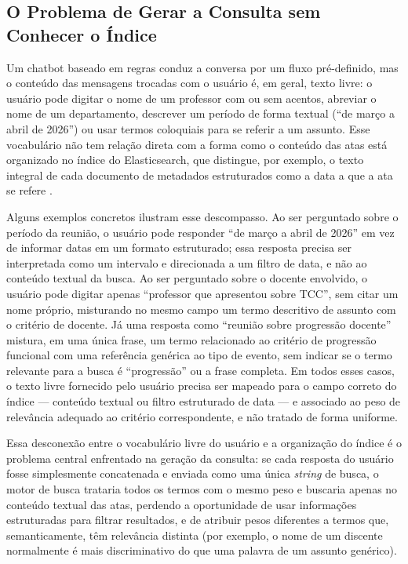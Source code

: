 \subsection{O Problema de Gerar a Consulta sem Conhecer o Índice}\label{sec:problema-gerar-consulta}

Um chatbot baseado em regras conduz a conversa por um fluxo pré-definido, mas o conteúdo das mensagens trocadas com o usuário é, em geral, texto livre: o usuário pode digitar o nome de um professor com ou sem acentos, abreviar o nome de um departamento, descrever um período de forma textual (``de março a abril de 2026'') ou usar termos coloquiais para se referir a um assunto. Esse vocabulário não tem relação direta com a forma como o conteúdo das atas está organizado no índice do Elasticsearch, que distingue, por exemplo, o texto integral de cada documento de metadados estruturados como a data a que a ata se refere \cite{IBMElasticsearch}.

Alguns exemplos concretos ilustram esse descompasso. Ao ser perguntado sobre o período da reunião, o usuário pode responder ``de março a abril de 2026'' em vez de informar datas em um formato estruturado; essa resposta precisa ser interpretada como um intervalo e direcionada a um filtro de data, e não ao conteúdo textual da busca. Ao ser perguntado sobre o docente envolvido, o usuário pode digitar apenas ``professor que apresentou sobre TCC'', sem citar um nome próprio, misturando no mesmo campo um termo descritivo de assunto com o critério de docente. Já uma resposta como ``reunião sobre progressão docente'' mistura, em uma única frase, um termo relacionado ao critério de progressão funcional com uma referência genérica ao tipo de evento, sem indicar se o termo relevante para a busca é ``progressão'' ou a frase completa. Em todos esses casos, o texto livre fornecido pelo usuário precisa ser mapeado para o campo correto do índice — conteúdo textual ou filtro estruturado de data — e associado ao peso de relevância adequado ao critério correspondente, e não tratado de forma uniforme.

Essa desconexão entre o vocabulário livre do usuário e a organização do índice é o problema central enfrentado na geração da consulta: se cada resposta do usuário fosse simplesmente concatenada e enviada como uma única \textit{string} de busca, o motor de busca trataria todos os termos com o mesmo peso e buscaria apenas no conteúdo textual das atas, perdendo a oportunidade de usar informações estruturadas para filtrar resultados, e de atribuir pesos diferentes a termos que, semanticamente, têm relevância distinta (por exemplo, o nome de um discente normalmente é mais discriminativo do que uma palavra de um assunto genérico).

